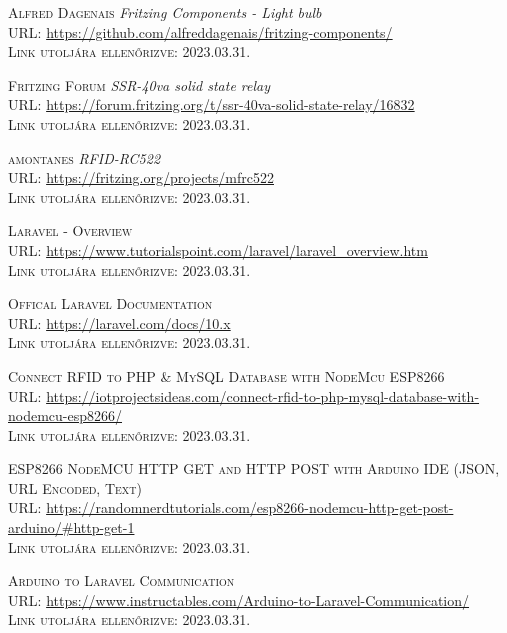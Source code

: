 \documentclass[
]{thesis-ekf}
\theoremstyle{definition}
\theoremstyle{remark}
\begin{document}
\begin{thebibliography}{20}
		\textsc{Alfred Dagenais} \emph{Fritzing Components - Light bulb}\\
		\textsc{URL:} \url{https://github.com/alfreddagenais/fritzing-components/}\\
		\textsc{Link utoljára ellenőrizve:} 2023.03.31.
		
		\textsc{Fritzing Forum} \emph{SSR-40va solid state relay}\\
		\textsc{URL:} \url{https://forum.fritzing.org/t/ssr-40va-solid-state-relay/16832}\\
		\textsc{Link utoljára ellenőrizve:} 2023.03.31.
		
		\textsc{amontanes} \emph{RFID-RC522}\\
		\textsc{URL:} \url{https://fritzing.org/projects/mfrc522}\\
		\textsc{Link utoljára ellenőrizve:} 2023.03.31.
		
		\textsc{Laravel - Overview}\\
		\textsc{URL:} \url{https://www.tutorialspoint.com/laravel/laravel_overview.htm}\\
		\textsc{Link utoljára ellenőrizve:} 2023.03.31.
		
		\textsc{Offical Laravel Documentation}\\
		\textsc{URL:} \url{https://laravel.com/docs/10.x}\\
		\textsc{Link utoljára ellenőrizve:} 2023.03.31.
		
		\textsc{Connect RFID to PHP \& MySQL Database with NodeMcu ESP8266}\\
		\textsc{URL:} \url{https://iotprojectsideas.com/connect-rfid-to-php-mysql-database-with-nodemcu-esp8266/}\\
		\textsc{Link utoljára ellenőrizve:} 2023.03.31.
		
		\textsc{ESP8266 NodeMCU HTTP GET and HTTP POST with Arduino IDE (JSON, URL Encoded, Text)}\\
		\textsc{URL:} \url{https://randomnerdtutorials.com/esp8266-nodemcu-http-get-post-arduino/#http-get-1}\\
		\textsc{Link utoljára ellenőrizve:} 2023.03.31.
		
		\textsc{Arduino to Laravel Communication}\\
		\textsc{URL:} \url{https://www.instructables.com/Arduino-to-Laravel-Communication/}\\
		\textsc{Link utoljára ellenőrizve:} 2023.03.31.
		

\end{thebibliography}
\end{document}
